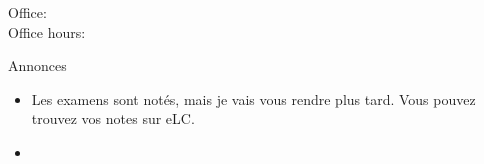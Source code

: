 \documentclass{beamer}
\subtitle[Adjectifs prénominaux]{Les adjectifs prénominaux}
\begin{document}
  \begin{frame}
    \titlepage
    \tiny{Office: \\
          Office hours: }
  \end{frame}

  \begin{frame}{Annonces}
    \begin{itemize}
      \item Les examens sont notés, mais je vais vous rendre plus tard. Vous pouvez trouvez vos notes sur eLC.
      \item[] 
    \end{itemize}
  \end{frame}
\end{document}

